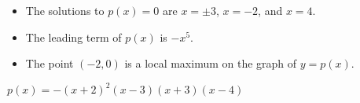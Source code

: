 {\begin{itemize}

\item The solutions to $p(x) =0$ are $x = \pm 3$, $x=-2$, and $x=4$.
\item The leading term of $p(x)$ is $-x^5$.
\item The point $(-2, 0)$ is a local maximum on the graph of $y=p(x)$.

\end{itemize}}
{$p(x) = -(x + 2)^{2}(x - 3)(x + 3)(x - 4)$
}